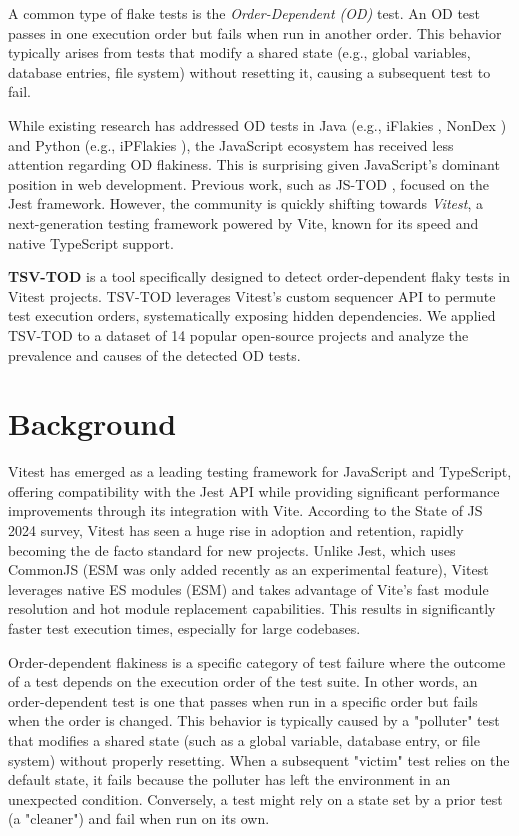 \documentclass[10pt, conference]{IEEEtran}
\begin{document}
A common type of flake tests is the \textit{Order-Dependent (OD)} test. An OD test passes in one execution order but fails when run in another order. This behavior typically arises from tests that modify a shared state (e.g., global variables, database entries, file system) without resetting it, causing a subsequent test to fail.

While existing research has addressed OD tests in Java (e.g., iFlakies \cite{shi2019iflakies}, NonDex \cite{gyori2016nondex}) and Python (e.g., iPFlakies \cite{wang2022ipflakies}), the JavaScript ecosystem has received less attention regarding OD flakiness. This is surprising given JavaScript's dominant position in web development. Previous work, such as JS-TOD \cite{hashemi2025detecting}, focused on the Jest framework. However, the community is quickly shifting towards \textit{Vitest}, a next-generation testing framework powered by Vite, known for its speed and native TypeScript support.

\textbf{TSV-TOD} is a tool specifically designed to detect order-dependent flaky tests in Vitest projects. TSV-TOD leverages Vitest's custom sequencer API to permute test execution orders, systematically exposing hidden dependencies. We applied TSV-TOD to a dataset of 14 popular open-source projects and analyze the prevalence and causes of the detected OD tests.

\section{Background}
Vitest has emerged as a leading testing framework for JavaScript and TypeScript, offering compatibility with the Jest API while providing significant performance improvements through its integration with Vite. According to the State of JS 2024 survey, Vitest has seen a huge rise in adoption and retention, rapidly becoming the de facto standard for new projects. Unlike Jest, which uses CommonJS (ESM was only added recently as an experimental feature), Vitest leverages native ES modules (ESM) and takes advantage of Vite's fast module resolution and hot module replacement capabilities. This results in significantly faster test execution times, especially for large codebases.

Order-dependent flakiness is a specific category of test failure where the outcome of a test depends on the execution order of the test suite. In other words, an order-dependent test is one that passes when run in a specific order but fails when the order is changed. This behavior is typically caused by a "polluter" \cite{lam2019idflakies} test that modifies a shared state (such as a global variable, database entry, or file system) without properly resetting. When a subsequent "victim" test relies on the default state, it fails because the polluter has left the environment in an unexpected condition. Conversely, a test might rely on a state set by a prior test (a "cleaner") and fail when run on its own.
\end{document}
